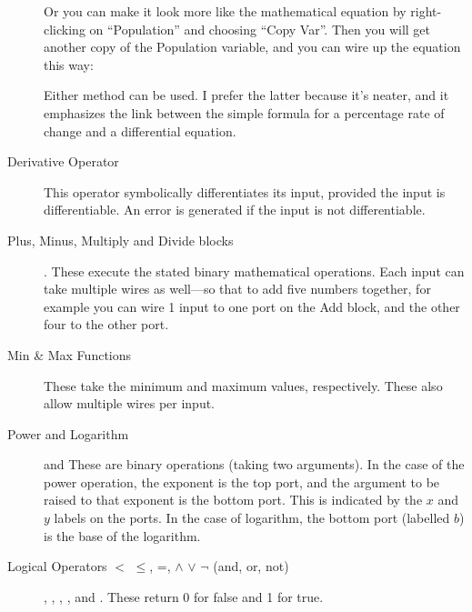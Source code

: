 \begin{description}
Or you can make it look more like the mathematical equation by
right-clicking on ``Population'' and choosing ``Copy Var''. Then you will
get another copy of the Population variable, and you can wire up the
equation this way:

\begin{center}
\end{center}

Either method can be used. I prefer the latter because it's neater,
and it emphasizes the link between the simple formula for a percentage
rate of change and a differential equation. 

\item[Derivative Operator]  This operator symbolically differentiates its input,
provided the input is differentiable. An error is generated if the input
is not differentiable.

\item[Plus, Minus, Multiply and Divide blocks]
    . These execute the stated binary
    mathematical operations. Each input can take multiple wires as
    well---so that to add five numbers together, for example you can wire 1 input
    to one port on the Add block, and the other four to the other
    port. 

\item[Min \& Max Functions] These take the minimum and maximum values, respectively.
These also allow multiple wires per input.

\item[Power and Logarithm]  and
 These are binary operations (taking two
arguments). In the case of the power operation, the exponent is the
top port, and the argument to be raised to that exponent is the bottom
port. This is indicated by the $x$ and $y$ labels on the ports. In the
case of logarithm, the bottom port (labelled $b$) is the base of the
logarithm.

\item[Logical Operators $<$ $\le$, =, $\wedge$ $\vee$ $\neg$ (and,
  or, not)] , ,
  , ,  and
  . These return 0 for false and 1 for true.


\end{description}
